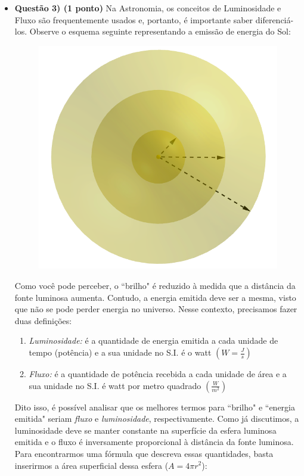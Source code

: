 \documentclass[a4paper, 12pt]{article}
\begin{document}
\begin{flushleft}
\begin{itemize}
		\item \textbf{Questão 3) (1 ponto)} Na Astronomia, os conceitos de Luminosidade e Fluxo são frequentemente usados e, portanto, é importante saber diferenciá-los. Observe o esquema seguinte representando a emissão de energia do Sol:
			\begin{figure}[H]
				\centering
				\includegraphics[scale=0.45]{./img/3.png}
			\end{figure}
			Como você pode perceber, o ``brilho" é reduzido à medida que a distância da fonte luminosa aumenta. Contudo, a energia emitida deve ser a mesma, visto que não se pode perder energia no universo. \linebreak
			Nesse contexto, precisamos fazer duas definições:
				\begin{enumerate}
					\item \textit{Luminosidade:} é a quantidade de energia emitida a cada unidade de tempo (potência) e a sua unidade no S.I. é o watt $\left( W=\frac{J}{s} \right)$
					\item \textit{Fluxo:} é a quantidade de potência recebida a cada unidade de área e a sua unidade no S.I. é watt por metro quadrado $\left( \frac{W}{m^2} \right)$
				\end{enumerate}
			Dito isso, é possível analisar que os melhores termos para ``brilho" e ``energia emitida" seriam \textit{fluxo} e \textit{luminosidade}, respectivamente. Como já discutimos, a luminosidade deve se manter constante na superfície da esfera luminosa emitida e o fluxo é inversamente proporcional à distância da fonte luminosa. Para encontrarmos uma fórmula que descreva essas quantidades, basta inserirmos a área superficial dessa esfera ($A=4 \pi r^2$):

\end{itemize}
\end{flushleft}
\end{document}
